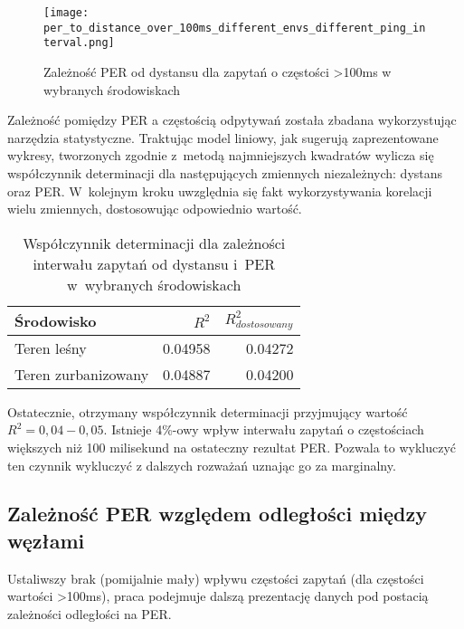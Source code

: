 \begin{figure}[!htb]
	\centering \texttt{[image: per\_to\_distance\_over\_100ms\_different\_envs\_different\_ping\_interval.png]} 
	\caption{Zależność \gls{PER} od dystansu dla zapytań o częstości >100ms w wybranych środowiskach}
	\label{rys:per_to_distance_over_100ms_different_envs_different_ping_interval}
\end{figure}

Zależność pomiędzy PER a częstością odpytywań została zbadana wykorzystując narzędzia statystyczne. Traktując model
liniowy, jak sugerują zaprezentowane wykresy, tworzonych zgodnie z~metodą najmniejszych kwadratów wylicza się 
współczynnik determinacji dla następujących zmiennych niezależnych: dystans oraz PER. W~kolejnym kroku uwzględnia
się fakt wykorzystywania korelacji wielu zmiennych, dostosowując odpowiednio wartość.


\begin{table}[!ht]
\centering
	\begin{tabular}{p{4.5cm}|r|r}
	Środowisko              & $R^2$             & $R^2_{dostosowany}$\\\hline
	Teren leśny             & 0.04958           & 0.04272\\\hline
	Teren zurbanizowany     & 0.04887           & 0.04200\\\hline
	\end{tabular}
\caption{\label{tab:corr_between_ping_intervals}Współczynnik determinacji dla zależności interwału zapytań od dystansu i~PER w~wybranych środowiskach}
\end{table}

Ostatecznie, otrzymany współczynnik determinacji przyjmujący wartość $R^2=0,04-0,05$.  Istnieje 4\%-owy wpływ
interwału zapytań o częstościach większych niż 100 milisekund na ostateczny rezultat PER. Pozwala to
wykluczyć ten czynnik wykluczyć z dalszych rozważań uznając go za marginalny.

\subsection{Zależność PER względem odległości między węzłami}

Ustaliwszy brak (pomijalnie mały) wpływu częstości zapytań (dla częstości wartości >100ms), praca podejmuje dalszą prezentację
danych pod postacią zależności odległości na PER.

